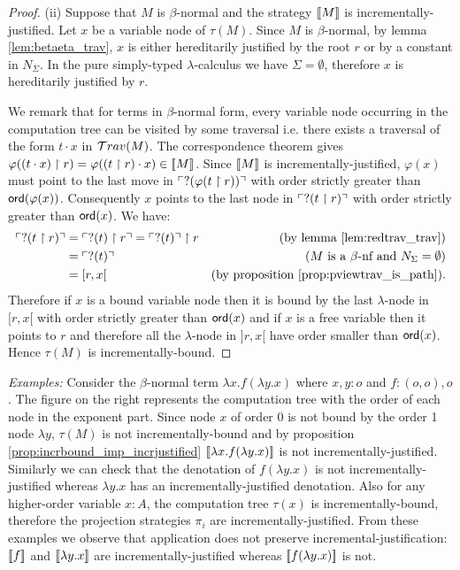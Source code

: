 \begin{proof}
\noindent (ii) Suppose that $M$ is $\beta$-normal and the strategy
${[\![ M ]\!]}$ is incrementally-justified. Let $x$ be a variable node of
$\tau(M)$. Since $M$ is $\beta$-normal, by lemma
\ref{lem:betaeta_trav}, $x$ is either hereditarily justified by the
root $r$ or by a constant in $N_\Sigma$. In the pure simply-typed
$\lambda$-calculus we have $\Sigma=\emptyset$, therefore $x$ is
hereditarily justified by $r$.


We remark that for terms in $\beta$-normal form, every variable node
occurring in the computation tree can be visited by some traversal
i.e. there exists a traversal of the form $t \cdot x$ in
$\mathcal{T}rav(M)$. The correspondence theorem gives $\varphi((t \cdot x)
\upharpoonright r) = \varphi((t \upharpoonright r) \cdot x) \in
{[\![M ]\!]}$. Since ${[\![ M ]\!]}$ is incrementally-justified, $\varphi(x)$
must point to the last move in $\ulcorner ?(\varphi(t \upharpoonright
r)) \urcorner$ with order strictly greater than ${\sf ord}(\varphi(x))$.
Consequently $x$ points to the last node in $\ulcorner ?(t
\upharpoonright r) \urcorner$ with order strictly greater than ${\sf ord}(x)$. We
have:
\begin{align*}
\ulcorner ?(t \upharpoonright r) \urcorner &= \ulcorner ?(t) \upharpoonright r \urcorner = \ulcorner ?(t) \urcorner \upharpoonright r & (\mbox{by lemma \ref{lem:redtrav_trav}}) \\
& = \ulcorner ?(t) \urcorner & (\mbox{$M$ is a $\beta$-nf and $N_\Sigma = \emptyset$}) \\
& = [r,x[ & (\mbox{by proposition \ref{prop:pviewtrav_is_path}}).
\end{align*}
Therefore if $x$ is a bound variable node then it is bound by the
last $\lambda$-node in $[r,x[$ with order strictly greater than
${\sf ord}(x)$ and if $x$ is a free variable then it points to $r$ and
therefore all the $\lambda$-node in $]r,x[$ have order smaller than
${\sf ord}(x)$. Hence $\tau(M)$ is incrementally-bound.
\end{proof}



\noindent \emph{Examples:} Consider the $\beta$-normal term $\lambda
x . f (\lambda y .x)$ where $x,y:o$ and $f:(o,o),o$. The figure on
the right represents the computation tree with the order of each
node in the exponent part. Since node $x$ of order $0$ is not bound
by the order 1 node $\lambda y$, $\tau(M)$ is not
incrementally-bound and by proposition
\ref{prop:incrbound_imp_incrjustified} ${[\![ \lambda x . f (\lambda
y .x) ]\!]}$ is not incrementally-justified. Similarly we can check that
the denotation of $f (\lambda y .x)$ is not incrementally-justified
whereas $\lambda y. x$ has an incrementally-justified denotation.
Also for any higher-order variable $x:A$, the computation tree
$\tau(x)$ is incrementally-bound, therefore the projection
strategies $\pi_i$ are incrementally-justified. From these examples
we observe that application does not preserve
incremental-justification: ${[\![ f ]\!]}$ and ${[\![ \lambda y. x ]\!]}$ are
incrementally-justified whereas ${[\![ f (\lambda y .x) ]\!]}$ is not.

